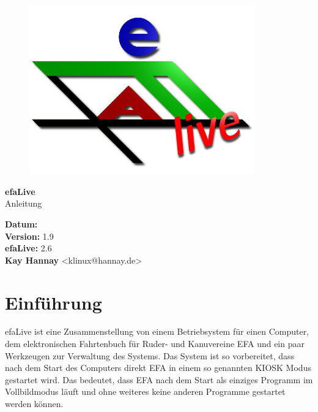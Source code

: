 \documentclass[a4paper,12pt,twoside]{article}
\title{\Title}
\author{\Author}
\date{\DocDate}
\begin{document}

\begin{titlepage}
    \vspace*{1cm}
    \begin{center}
        \begin{figure}
            \centering
            \includegraphics[width=9.745cm,height=7.308cm]{screenshots/efaLivede-img1.png}
        \end{figure}
        \Huge
        \textbf{efaLive} \\[0.1cm]
        \LARGE
        Anleitung \\[5cm]
    \end{center}
    \normalsize
    \vspace*{4cm}
    \textbf{Datum:} {\DocDate} \\
    \textbf{Version:} 1.9 \\
    \textbf{efaLive:} 2.6 \\
    \textbf{Kay Hannay} <klinux@hannay.de> \\
\end{titlepage}


\tableofcontents
\clearpage\setcounter{page}{1}
\section{Einführung}
\label{sct:einfuehrung}
efaLive ist eine Zusammenstellung von einem Betriebsystem für einen Computer, 
dem elektronischen Fahrtenbuch für Ruder- und Kanuvereine EFA und ein paar 
Werkzeugen zur Verwaltung des Systems. Das System ist so vorbereitet, dass nach
dem Start des Computers direkt EFA in einem so genannten KIOSK Modus gestartet 
wird. Das bedeutet, dass EFA nach dem Start als einziges Programm im Vollbildmodus
läuft und ohne weiteres keine anderen Programme gestartet werden können.
\end{document}
